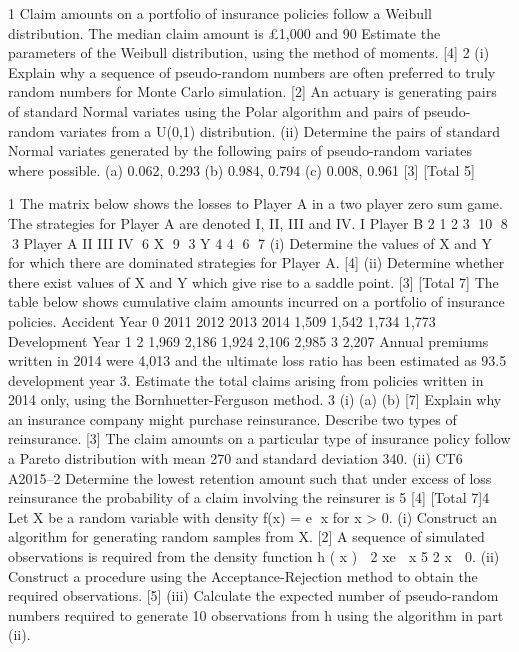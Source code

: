 \documentclass[a4paper,12pt]{article}
\begin{document}
\begin{enumerate}
1
Claim amounts on a portfolio of insurance policies follow a Weibull distribution. The
median claim amount is £1,000 and 90%
Estimate the parameters of the Weibull distribution, using the method of moments. [4]
2
(i)
Explain why a sequence of pseudo-random numbers are often preferred to
truly random numbers for Monte Carlo simulation.
[2]
An actuary is generating pairs of standard Normal variates using the Polar algorithm
and pairs of pseudo-random variates from a U(0,1) distribution.
(ii)
Determine the pairs of standard Normal variates generated by the following
pairs of pseudo-random variates where possible.
(a) 0.062, 0.293
(b) 0.984, 0.794
(c) 0.008, 0.961
[3]
[Total 5]

1
The matrix below shows the losses to Player A in a two player zero sum game. The
strategies for Player A are denoted I, II, III and IV.
I
Player B
2
1
2
3
10
8
3
Player A
II
III IV
6
X
9 3
Y
4
4
6
7
(i) Determine the values of X and Y for which there are dominated strategies for
Player A.
[4]
(ii) Determine whether there exist values of X and Y which give rise to a saddle
point.
[3]
[Total 7]
The table below shows cumulative claim amounts incurred on a portfolio of insurance
policies.
Accident Year
0
2011
2012
2013
2014
1,509
1,542
1,734
1,773
Development Year
1
2
1,969
2,186
1,924
2,106
2,985
3
2,207
Annual premiums written in 2014 were 4,013 and the ultimate loss ratio has been
estimated as 93.5%
development year 3.
Estimate the total claims arising from policies written in 2014 only, using the
Bornhuetter-Ferguson method.
3
(i)
(a)
(b)
[7]
Explain why an insurance company might purchase reinsurance.
Describe two types of reinsurance.
[3]
The claim amounts on a particular type of insurance policy follow a Pareto
distribution with mean 270 and standard deviation 340.
(ii)
CT6 A2015–2
Determine the lowest retention amount such that under excess of loss
reinsurance the probability of a claim involving the reinsurer is 5%
[4]
[Total 7]4
Let X be a random variable with density f(x) = e x for x > 0.
(i)
Construct an algorithm for generating random samples from X.
[2]
A sequence of simulated observations is required from the density function
h ( x )  2 xe  x
5
2
x  0.
(ii) Construct a procedure using the Acceptance-Rejection method to obtain the
required observations.
[5]
(iii) Calculate the expected number of pseudo-random numbers required to
generate 10 observations from h using the algorithm in part (ii).

\end{enumerate}
\end{document}
